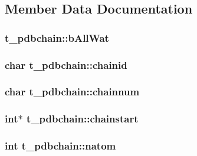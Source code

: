 \subsection{\-Member \-Data \-Documentation}
\hypertarget{structt__pdbchain_a5a44e5990cca32bcdbc06ac29817375b}{
\subsubsection[{b\-All\-Wat}]{ {\bf t\-\_\-pdbchain\-::b\-All\-Wat}}}\label{structt__pdbchain_a5a44e5990cca32bcdbc06ac29817375b}
\hypertarget{structt__pdbchain_a47574a6ffec32fe45b0002ee0de11745}{
\subsubsection[{chainid}]{\setlength{\rightskip}{0pt plus 5cm}char {\bf t\-\_\-pdbchain\-::chainid}}}\label{structt__pdbchain_a47574a6ffec32fe45b0002ee0de11745}
\hypertarget{structt__pdbchain_ad7aba8e3ef88f3697c4363f5d8bd36a1}{
\subsubsection[{chainnum}]{\setlength{\rightskip}{0pt plus 5cm}char {\bf t\-\_\-pdbchain\-::chainnum}}}\label{structt__pdbchain_ad7aba8e3ef88f3697c4363f5d8bd36a1}
\hypertarget{structt__pdbchain_a35bc979d3b945382b16b03c170c570a7}{
\subsubsection[{chainstart}]{\setlength{\rightskip}{0pt plus 5cm}int$\ast$ {\bf t\-\_\-pdbchain\-::chainstart}}}\label{structt__pdbchain_a35bc979d3b945382b16b03c170c570a7}
\hypertarget{structt__pdbchain_ae0c1a673530f2c55f490a3b71e7b2b20}{
\subsubsection[{natom}]{\setlength{\rightskip}{0pt plus 5cm}int {\bf t\-\_\-pdbchain\-::natom}}}\label{structt__pdbchain_ae0c1a673530f2c55f490a3b71e7b2b20}
